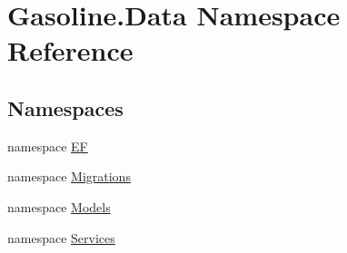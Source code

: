 \hypertarget{namespace_gasoline_1_1_data}{}\section{Gasoline.\+Data Namespace Reference}
\label{namespace_gasoline_1_1_data}
\subsection*{Namespaces}
\begin{DoxyCompactItemize}
\item 
namespace \mbox{\hyperlink{namespace_gasoline_1_1_data_1_1_e_f}{EF}}
\item 
namespace \mbox{\hyperlink{namespace_gasoline_1_1_data_1_1_migrations}{Migrations}}
\item 
namespace \mbox{\hyperlink{namespace_gasoline_1_1_data_1_1_models}{Models}}
\item 
namespace \mbox{\hyperlink{namespace_gasoline_1_1_data_1_1_services}{Services}}
\end{DoxyCompactItemize}
